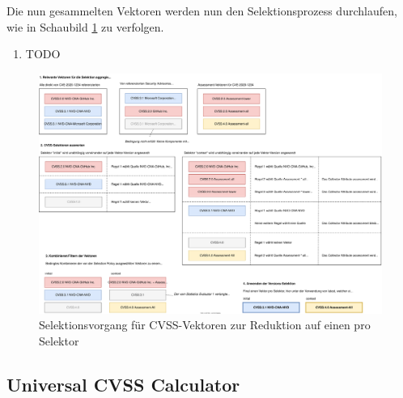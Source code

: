 Die nun gesammelten Vektoren werden nun den Selektionsprozess durchlaufen, wie in Schaubild \ref{fig:cvss-selection-process-selection} zu verfolgen.

\begin{enumerate}
    \item TODO
\end{enumerate}

\begin{figure}[htbp] %
    \centering
    \includegraphics[width=1\textwidth, keepaspectratio]{res/grafiken/cvss-selection-process-selection}
    \caption{Selektionsvorgang für CVSS-Vektoren zur Reduktion auf einen pro Selektor}
    \label{fig:cvss-selection-process-selection}
\end{figure}

\subsection{Universal CVSS Calculator} \label{subsec:projektbericht-loesungsweg-typescript-cvss-online-calculator}
